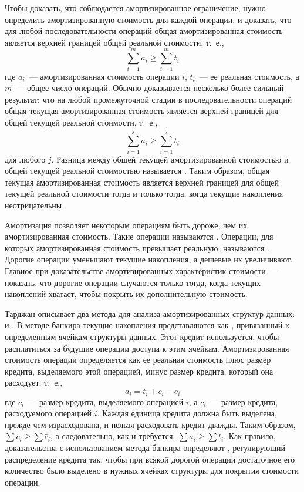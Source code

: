 Чтобы доказать, что соблюдается амортизированное ограничение, нужно
определить амортизированную стоимость для каждой операции, и доказать,
что для любой последовательности операций общая амортизированная
стоимость является верхней границей общей реальной стоимости, т.~е.,
$$
\sum_{i=1}^m a_i \ge \sum_{i=1}^m t_i
$$
где $a_i$~--- амортизированная стоимость операции $i$, $t_i$~--- ее
реальная стоимость, а $m$~--- общее число операций. Обычно
доказывается несколько более сильный результат: что на любой
промежуточной стадии в последовательности операций общая текущая
амортизированная стоимость является верхней границей для общей текущей
реальной стоимости, т.~е.,
$$
\sum_{i=1}^j a_i \ge \sum_{i=1}^j t_i
$$
для любого $j$. Разница между общей текущей амортизированной стоимостью
и общей текущей реальной стоимостью называется
. Таким образом, общая
текущая амортизированная стоимость является верхней границей для
общей текущей реальной стоимости тогда и только тогда, когда текущие
накопления неотрицательны.

Амортизация позволяет некоторым операциям быть дороже, чем их
амортизированная стоимость. Такие операции называются
. Операции, для которых амортизированная
стоимость превышает реальную, называются
. Дорогие операции уменьшают текущие накопления,
а дешевые их увеличивают. Главное при доказательстве
амортизированных характеристик стоимости~--- показать, что дорогие
операции случаются только тогда, когда текущих накоплений хватает,
чтобы покрыть их дополнительную стоимость.

Тарджан \cite{Tarjan1985} описывает два метода для анализа
амортизированных структур данных:  и . В методе банкира
текущие накопления представляются как ,
привязанный к определенным ячейкам структуры данных. Этот кредит
используется, чтобы расплатиться за будущие операции доступа к этим
ячейкам.  Амортизированная стоимость операции определяется как ее
реальная стоимость плюс размер кредита, выделяемого этой операцией,
минус размер кредита, который она расходует, т.~е.,
$$
a_i = t_i + c_i - \bar{c}_i
$$
где $c_i$~--- размер кредита, выделяемого операцией $i$, а $\bar{c}_i$~---
размер кредита, расходуемого операцией $i$. Каждая единица кредита
должна быть выделена, прежде чем израсходована, и нельзя расходовать
кредит дважды. Таким образом, $\sum c_i \ge \sum \bar{c}_i$, а
следовательно, как и требуется, $\sum a_i \ge \sum t_i$. Как правило,
доказательства с использованием метода банкира определяют
, регулирующий распределение
кредита так, чтобы при всякой дорогой операции достаточное его
количество было выделено в нужных ячейках структуры для покрытия
стоимости операции.

